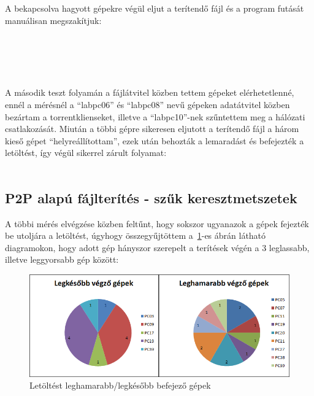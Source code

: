 \\\\
A bekapcsolva hagyott gépekre végül eljut a terítendő fájl és a program futását manuálisan megszakítjuk:\\\\
\\
\\
\\\\
A második teszt folyamán a fájlátvitel közben tettem gépeket elérhetetlenné, ennél a mérésnél a ``labpc06'' és ``labpc08'' nevű gépeken adatátvitel közben bezártam a torrentklienseket, illetve a ``labpc10''-nek szűntettem meg a hálózati csatlakozását. Miután a többi gépre sikeresen eljutott a terítendő fájl a három kieső gépet ``helyreállítottam'', ezek után behozták a lemaradást és befejezték a letöltést, így végül sikerrel zárult folyamat:\\\\

%
\subsection{P2P alapú fájlterítés - szűk keresztmetszetek}
%

A többi mérés elvégzése közben feltűnt, hogy sokszor ugyanazok a gépek fejezték be utoljára a letöltést, úgyhogy összegyűjtöttem a~\ref{fig:computerdownloadspeeds}-es ábrán látható diagramokon, hogy adott gép hányszor szerepelt a terítések végén a 3 leglassabb, illetve leggyorsabb gép között:


\begin{figure}[ht]
\centering
\includegraphics[width=150mm, keepaspectratio]{figures/Perf_computers.png}
\caption{Letöltést leghamarabb/legkésőbb befejező gépek}
\label{fig:computerdownloadspeeds}
\end{figure}

